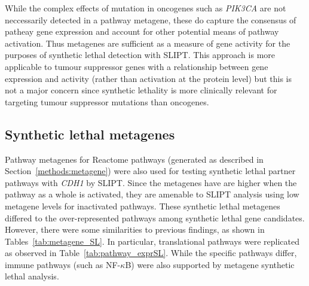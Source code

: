  While the complex effects of mutation in oncogenes such as \textit{PIK3CA} are not neccessarily detected in a pathway metagene, these do capture the consensus of patheay gene expression and account for other potential means of pathway activation. Thus metagenes are sufficient as a measure of gene activity for the purposes of synthetic lethal detection with SLIPT. This approach is more applicable to tumour suppressor genes with a relationship between gene expression and activity (rather than activation at the protein level) but this is not a major concern since synthetic lethality is more clinically relevant for targeting tumour suppressor mutations than oncogenes.

\FloatBarrier

\subsection{Synthetic lethal metagenes} \label{chapt3:metagene_SL}

Pathway metagenes for Reactome pathways (generated as described in Section~\ref{methods:metagene}) were also used for testing synthetic lethal partner pathways with \textit{CDH1} by SLIPT. Since the metagenes have are higher when the pathway as a whole is activated, they are amenable to SLIPT analysis using low metagene levels for inactivated pathways. These synthetic lethal metagenes differed to the over-represented pathways among synthetic lethal gene candidates. However, there were some similarities to previous findings, as shown in Tables~\ref{tab:metagene_SL}. In particular, translational pathways were replicated as observed in Table~\ref{tab:pathway_exprSL}. While the specific pathways differ, immune pathways (such as NF-$\kappa$B) were also supported by metagene synthetic lethal analysis.

